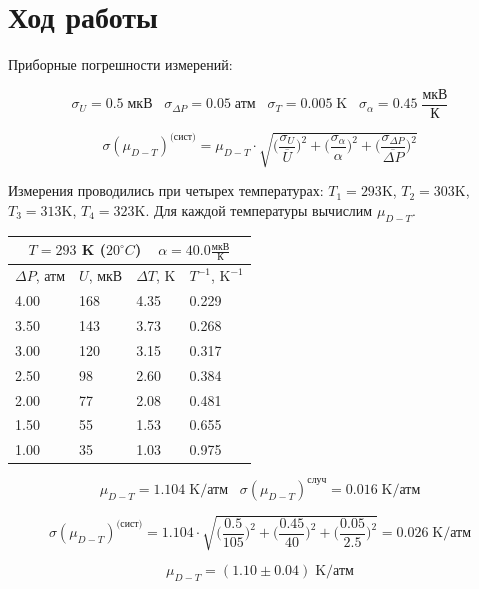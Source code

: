 \documentclass[a4paper, 12pt]{article}
\begin{document}
\section*{Ход работы}

	Приборные погрешности измерений:
	
	$$\sigma_U = 0.5 \; \text{мкВ} \;\;\; \sigma_{\Delta P} = 0.05 \; \text{атм} \;\;\; \sigma_T = 0.005 \; \text{K} \;\;\; \sigma_\alpha = 0.45 \; \frac{\text{мкВ}}{\text{К}}$$

	$$\sigma(\mu_{D-T})^{ \text{(сист)} } = \mu_{D-T} \cdot \sqrt{ 
		\Big(\frac{\sigma_U}{\overline{U}} \Big)^2 +
		\Big(\frac{\sigma_{\alpha}}{\alpha} \Big)^2 +
		\Big(\frac{\sigma_{\Delta P}}{\overline{\Delta P}} \Big)^2
	}$$
	
	Измерения проводились при четырех температурах: $T_1=293$K, $T_2=303$K, $T_3=313$K, $T_4=323$K. Для каждой температуры вычислим $\mu_{D-T}$.
	
	\begin{table}[H]
		\centering
		\begin{tabular}{llll}
			\hline
			\multicolumn{4}{c}{$T=293$ K ($20^\circ C$) $ \;\;\; \alpha = 40.0 \frac{\text{мкВ}}{\text{К}} $} \\
			\hline
			$\Delta P$, атм & $U$, мкВ & $\Delta T$, K & $T^{-1}$, $\text{K}^{-1}$ \\ \hline
			4.00        & 168      & 4.35  & 0.229            \\
			3.50      & 143      & 3.73  & 0.268            \\
			3.00         & 120      & 3.15  & 0.317            \\
			2.50       & 98       & 2.60  & 0.384            \\
			2.00         & 77       & 2.08  & 0.481            \\
			1.50       & 55       & 1.53  & 0.655            \\
			1.00         & 35       & 1.03  & 0.975            \\	\hline
		\end{tabular}
	\end{table}

	$$ \mu_{D-T} = 1.104 \; \text{K/атм} \;\;\; \sigma(\mu_{D-T})^{\text{случ}} = 0.016 \; \text{K/атм} $$

	$$ \sigma(\mu_{D-T})^{ \text{(сист)} } = 1.104 \cdot \sqrt{
		\Big(\frac{0.5}{105}\Big)^2 + 
		\Big(\frac{0.45}{40}\Big)^2 + 
		\Big(\frac{0.05}{2.5}\Big)^2
	} = 0.026 \; \text{K/атм} $$

	\begin{equation*}
		\mu_{D-T} = (1.10 \pm 0.04) \; \text{K/атм}
	\end{equation*}
\end{document}
